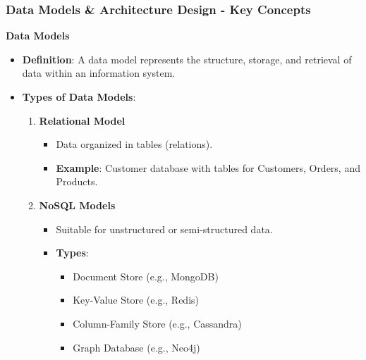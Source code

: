 \documentclass[aspectratio=169]{beamer}
\begin{document}
\begin{frame}[fragile]
    \frametitle{Data Models \& Architecture Design - Key Concepts}
    \textbf{Data Models}
    \begin{itemize}
        \item \textbf{Definition}: A data model represents the structure, storage, and retrieval of data within an information system.
        \item \textbf{Types of Data Models}:
            \begin{enumerate}
                \item \textbf{Relational Model}
                    \begin{itemize}
                        \item Data organized in tables (relations).
                        \item \textbf{Example}: Customer database with tables for Customers, Orders, and Products.
                    \end{itemize}
                \item \textbf{NoSQL Models}
                    \begin{itemize}
                        \item Suitable for unstructured or semi-structured data.
                        \item \textbf{Types}:
                            \begin{itemize}
                                \item Document Store (e.g., MongoDB)
                                \item Key-Value Store (e.g., Redis)
                                \item Column-Family Store (e.g., Cassandra)
                                \item Graph Database (e.g., Neo4j)
                            \end{itemize}
                    \end{itemize}
            \end{enumerate}
    \end{itemize}
\end{frame}
\end{document}
